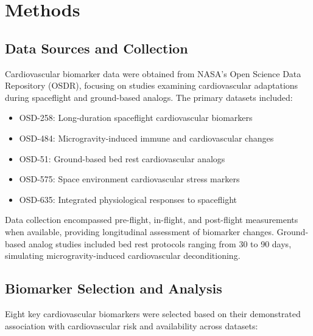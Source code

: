 \documentclass[11pt,a4paper]{article}
\begin{document}
\section{Methods}

\subsection{Data Sources and Collection}

Cardiovascular biomarker data were obtained from NASA's Open Science Data Repository (OSDR), focusing on studies examining cardiovascular adaptations during spaceflight and ground-based analogs. The primary datasets included:

\begin{itemize}
    \item OSD-258: Long-duration spaceflight cardiovascular biomarkers
    \item OSD-484: Microgravity-induced immune and cardiovascular changes
    \item OSD-51: Ground-based bed rest cardiovascular analogs
    \item OSD-575: Space environment cardiovascular stress markers
    \item OSD-635: Integrated physiological responses to spaceflight
\end{itemize}

Data collection encompassed pre-flight, in-flight, and post-flight measurements when available, providing longitudinal assessment of biomarker changes. Ground-based analog studies included bed rest protocols ranging from 30 to 90 days, simulating microgravity-induced cardiovascular deconditioning.

\subsection{Biomarker Selection and Analysis}

Eight key cardiovascular biomarkers were selected based on their demonstrated association with cardiovascular risk and availability across datasets:
\end{document}
